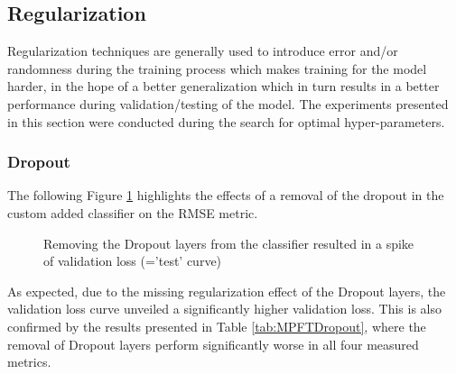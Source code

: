 \subsection{Regularization}
Regularization techniques are generally used to introduce error and/or randomness during the training process which makes training for the model harder, in the hope of a better generalization which in turn results in a better performance during validation/testing of the model. The experiments presented in this section were conducted during the search for optimal hyper-parameters.

\subsubsection{Dropout}
The following Figure \ref{fig:AblationNoDropout} highlights the effects of a removal of the dropout in the custom added classifier on the RMSE metric.

\begin{figure}[H]
  \centering
  \hfill
  \caption[Ablation Study: Dropout loss curve]{Removing the Dropout layers from the classifier resulted in a spike of validation loss (='test' curve)}
  \label{fig:AblationNoDropout}
\end{figure}

As expected, due to the missing regularization effect of the Dropout layers, the validation loss curve unveiled a significantly higher validation loss. This is also confirmed by the results presented in Table \ref{tab:MPFTDropout}, where the removal of Dropout layers perform significantly worse in all four measured metrics.


